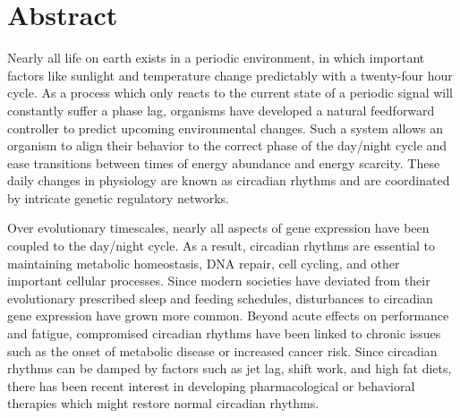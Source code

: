 \chapter*{Abstract}

Nearly all life on earth exists in a periodic environment, in which important factors like sunlight and temperature change predictably with a twenty-four hour cycle.
As a process which only reacts to the current state of a periodic signal will constantly suffer a phase lag, organisms have developed a natural feedforward controller to predict upcoming environmental changes.
Such a system allows an organism to align their behavior to the correct phase of the day/night cycle and ease transitions between times of energy abundance and energy scarcity.
These daily changes in physiology are known as circadian rhythms and are coordinated by intricate genetic regulatory networks.

Over evolutionary timescales, nearly all aspects of gene expression have been coupled to the day/night cycle.
As a result, circadian rhythms are essential to maintaining metabolic homeostasis, DNA repair, cell cycling, and other important cellular processes.
Since modern societies have deviated from their evolutionary prescribed sleep and feeding schedules, disturbances to circadian gene expression have grown more common.
Beyond acute effects on performance and fatigue, compromised circadian rhythms have been linked to chronic issues such as the onset of metabolic disease or increased cancer risk.
Since circadian rhythms can be damped by factors such as jet lag, shift work, and high fat diets, there has been recent interest in developing pharmacological or behavioral therapies which might restore normal circadian rhythms.

